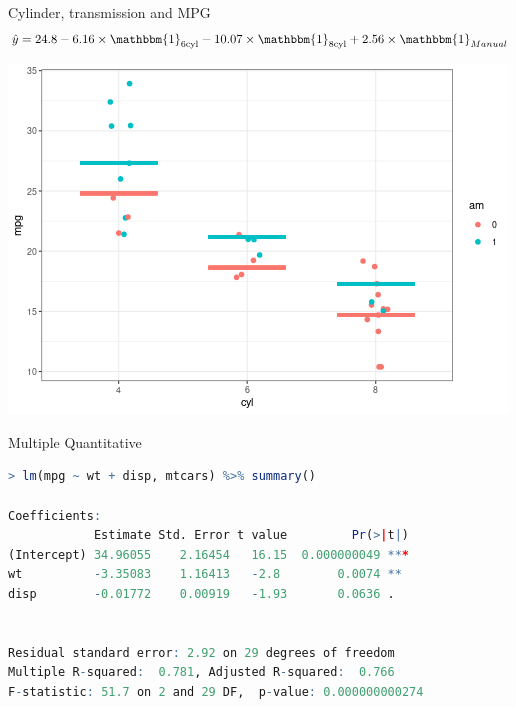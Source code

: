 \documentclass{beamer}
\begin{document}
\begin{frame}{Cylinder, transmission and MPG}
\begin{align*}
\hat{y} = 24.8  - 6.16 \times \mathbbm{1}_{6 \text{cyl}} - 10.07 \times \mathbbm{1}_{8 \text{cyl}} + 2.56 \times \mathbbm{1}_{Manual}
\end{align*}
\begin{center}
\includegraphics[scale=0.5]{cyl_am_mpg.png}
\end{center}
\end{frame}


\begin{frame}[fragile]{Multiple Quantitative}

\begin{lstlisting}[language=R]
> lm(mpg ~ wt + disp, mtcars) %>% summary()

Coefficients:
            Estimate Std. Error t value         Pr(>|t|)    
(Intercept) 34.96055    2.16454   16.15  0.000000049 ***
wt          -3.35083    1.16413   -2.8        0.0074 ** 
disp        -0.01772    0.00919   -1.93       0.0636 .  


Residual standard error: 2.92 on 29 degrees of freedom
Multiple R-squared:  0.781,	Adjusted R-squared:  0.766 
F-statistic: 51.7 on 2 and 29 DF,  p-value: 0.000000000274
\end{lstlisting}

\end{frame}
\end{document}
